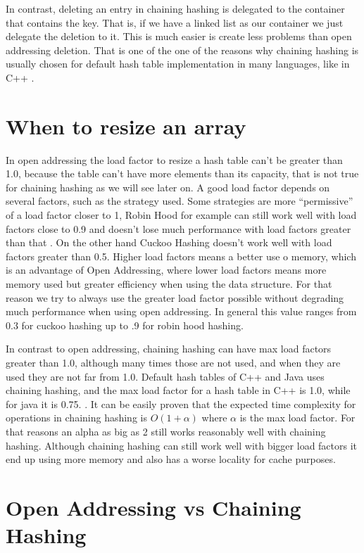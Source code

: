 In contrast, deleting an entry in chaining hashing is delegated to the container that contains the key. That is, if we have a linked list as our container we just delegate the deletion to it. This is much easier is create less problems than open addressing deletion. That is one of the one of the reasons why chaining hashing is usually chosen for default hash table implementation in many languages, like in C++ \citep{UnorderedMapDiscussion}.

\section{When to resize an array}

In open addressing the load factor to resize a hash table can't be greater than 1.0, because the table can't have more elements than its capacity, that is not true for chaining hashing as we will see later on. A good load factor depends on several factors, such as the strategy used. Some strategies are more ``permissive'' of a load factor closer to 1, Robin Hood for example can still work well with load factors close to 0.9 and doesn't lose much performance with load factors greater than that \citep{RobinHoodDefault}. On the other hand Cuckoo Hashing doesn't work well with load factors greater than 0.5. Higher load factors means a better use o memory, which is an advantage of Open Addressing, where lower load factors means more memory used but greater efficiency when using the data structure. For that reason we try to always use the greater load factor possible without degrading much performance when using open addressing. In general this value ranges from 0.3 for cuckoo hashing up to .9 for robin hood hashing.

In contrast to open addressing, chaining hashing can have max load factors greater than 1.0, although many times those are not used, and when they are used they are not far from 1.0. Default hash tables of C++ and Java uses chaining hashing, and the max load factor for a hash table in C++ is 1.0, while for java it is 0.75. \citep{MaxLoadFactorCplusplus}.
It can be easily proven that the expected time complexity for operations in chaining hashing is \( O(1 + \alpha) \) where \( \alpha \) is the max load factor. For that reasons an alpha as big as 2 still works reasonably well with chaining hashing.
Although chaining hashing can still work well with bigger load factors it end up using more memory and also has a worse locality for cache purposes.

\section{Open Addressing vs Chaining Hashing}

